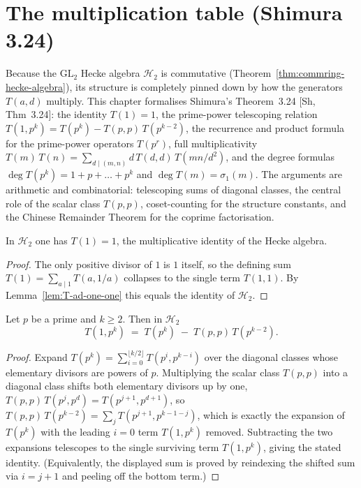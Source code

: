 \chapter{The multiplication table (Shimura 3.24)}\label{chap:multiplication-table}

Because the $\mathrm{GL}_2$ Hecke algebra $\mathcal{H}_2$ is commutative
(Theorem~\ref{thm:commring-hecke-algebra}), its structure is completely pinned down by how the
generators $T(a,d)$ multiply. This chapter formalises Shimura's Theorem~3.24 [Sh, Thm~3.24]: the
identity $T(1)=1$, the prime-power telescoping relation $T(1,p^k)=T(p^k)-T(p,p)\,T(p^{k-2})$, the
recurrence and product formula for the prime-power operators $T(p^r)$, full multiplicativity
$T(m)\,T(n)=\sum_{d\mid(m,n)} d\,T(d,d)\,T(mn/d^2)$, and the degree formulas
$\deg T(p^k)=1+p+\dots+p^k$ and $\deg T(m)=\sigma_1(m)$. The arguments are arithmetic and
combinatorial: telescoping sums of diagonal classes, the central role of the scalar class
$T(p,p)$, coset-counting for the structure constants, and the Chinese Remainder Theorem for the
coprime factorisation.

\begin{lemma}[$T(1)=1$]\label{lem:T-sum-one}
\leanok
In $\mathcal{H}_2$ one has $T(1)=1$, the multiplicative identity of the Hecke algebra.
\end{lemma}

\begin{proof}
\leanok
The only positive divisor of $1$ is $1$ itself, so the defining sum
$T(1)=\sum_{a\mid 1} T(a,1/a)$ collapses to the single term $T(1,1)$. By
Lemma~\ref{lem:T-ad-one-one} this equals the identity of $\mathcal{H}_2$.
\end{proof}

\begin{theorem}\label{thm:T-ad-one-ppow-eq}
\leanok
Let $p$ be a prime and $k\ge 2$. Then in $\mathcal{H}_2$
\[
  T(1,p^k) \;=\; T(p^k) \;-\; T(p,p)\,T(p^{k-2}).
\]
\end{theorem}

\begin{proof}
\leanok
Expand $T(p^k)=\sum_{i=0}^{\lfloor k/2\rfloor} T(p^i,p^{k-i})$ over the diagonal classes whose
elementary divisors are powers of $p$. Multiplying the scalar class $T(p,p)$ into a diagonal
class shifts both elementary divisors up by one, $T(p,p)\,T(p^j,p^{d})=T(p^{j+1},p^{d+1})$, so
$T(p,p)\,T(p^{k-2})=\sum_{j} T(p^{j+1},p^{k-1-j})$, which is exactly the expansion of $T(p^k)$
with the leading $i=0$ term $T(1,p^k)$ removed. Subtracting the two expansions telescopes to the
single surviving term $T(1,p^k)$, giving the stated identity. (Equivalently, the displayed sum is
proved by reindexing the shifted sum via $i=j+1$ and peeling off the bottom term.)
\end{proof}


